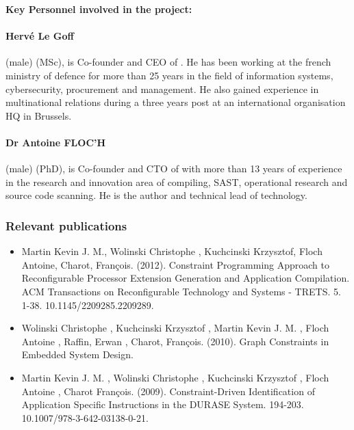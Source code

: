 \documentclass[a4paper,11pt]{article}
\begin{document}
\vspace{10pt}

\vspace{10pt}

\textbf{Key Personnel involved in the project:}

\paragraph{Hervé Le Goff} (male) (MSc), is Co-founder and CEO of \YAGlong{}. He has been working at the french ministry of defence for more than 25 years in the field of information systems, cybersecurity, procurement and management. He also gained experience in multinational relations during a three years post at an international organisation HQ in Brussels.

\vspace{10pt}

\paragraph{Dr Antoine FLOC'H} (male) (PhD), is Co-founder and CTO of \YAGlong{} with more than 13 years of experience in the research and innovation area of compiling, SAST, operational research and source code scanning. He is the author and technical lead of \YAGlong{} technology.

\subsubsection*{Relevant publications}
\begin{itemize}
\item Martin Kevin J. M., Wolinski Christophe , Kuchcinski Krzysztof, Floch Antoine, Charot, François. (2012). Constraint Programming Approach to Reconfigurable Processor Extension Generation and Application Compilation. ACM Transactions on Reconfigurable Technology and Systems - TRETS. 5. 1-38. 10.1145/2209285.2209289.
\item Wolinski Christophe , Kuchcinski Krzysztof , Martin Kevin J. M. , Floch Antoine , Raffin, Erwan , Charot, François. (2010). Graph Constraints in Embedded System Design. 
\item Martin Kevin J. M. , Wolinski Christophe , Kuchcinski Krzysztof , Floch Antoine , Charot François. (2009). Constraint-Driven Identification of Application Specific Instructions in the DURASE System. 194-203. 10.1007/978-3-642-03138-0-21. 
\end{itemize}
\end{document}

